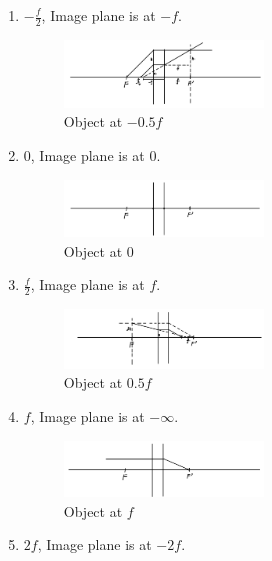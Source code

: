 \documentclass{article}
\begin{document}
\begin{enumerate}
    \item $-\frac{f}{2}$, Image plane is at $-f$.
          \begin{figure}[H]
              \centering
              \includegraphics[width=0.5\textwidth]{image/hw2/hw2_1_4.jpeg}
              \caption{Object at $-0.5f$}
          \end{figure}
    \item $0$, Image plane is at $0$.
          \begin{figure}[H]
              \centering
              \includegraphics[width=0.5\textwidth]{image/hw2/hw2_1_5.jpeg}
              \caption{Object at $0$}
          \end{figure}
    \item $\frac{f}{2}$, Image plane is at $f$.
          \begin{figure}[H]
              \centering
              \includegraphics[width=0.5\textwidth]{image/hw2/hw2_1_6.jpeg}
              \caption{Object at $0.5f$}
          \end{figure}
    \item $f$, Image plane is at $-\infty$.
          \begin{figure}[H]
              \centering
              \includegraphics[width=0.5\textwidth]{image/hw2/hw2_1_7.jpeg}
              \caption{Object at $f$}
          \end{figure}
    \item $2f$, Image plane is at $-2f$.
          \begin{figure}[H]
              \centering

\end{figure}
\end{enumerate}
\end{document}
